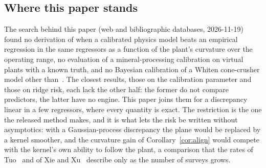 \subsection{Where this paper stands}

The search behind this paper (web and bibliographic databases, 2026-11-19) found no derivation of when a calibrated physics
model beats an empirical regression in the same regressors as a function of the plant's curvature over the operating range,
no evaluation of a mineral-processing calibration on virtual plants with a known truth, and no Bayesian calibration of a
Whiten cone-crusher model other than~\cite{cb002}. The closest results, those on the calibration parameter and those on ridge
risk, each lack the other half: the former do not compare predictors, the latter have no engine. This paper joins them
for a discrepancy linear in a few regressors, where every quantity is exact. The restriction is the one the released method
makes, and it is what lets the risk be written without asymptotics: with a Gaussian-process discrepancy the plane would be
replaced by a kernel smoother, and the curvature gain of Corollary~\ref{cor:align} would compete with the kernel's own ability
to follow the plant, a comparison that the rates of Tuo~\cite{tuo} and of Xie and Xu~\cite{xiexu} describe only as the number
of surveys grows.
